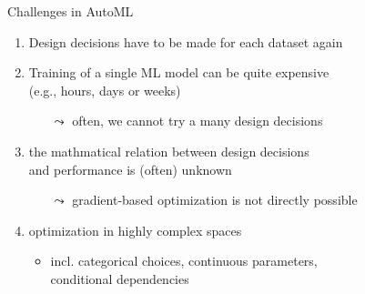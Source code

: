 \begin{frame}[c]{Challenges in AutoML}

\begin{enumerate}
  \item Design decisions have to be made for each dataset again
  \item Training of a single ML model can be quite expensive\\
  		(e.g., hours, days or weeks)
  \begin{itemize}
    \item[$\leadsto$] often, we cannot try a many design decisions
  \end{itemize}
  \item the mathmatical relation between design decisions\\ and performance is (often) unknown
  \begin{itemize}
    \item[$\leadsto$] gradient-based optimization is not directly possible
  \end{itemize}
  \item optimization in highly complex spaces
  \begin{itemize}
    \item incl. categorical choices, continuous parameters,\\ conditional dependencies
  \end{itemize}
  
\end{enumerate}

\end{frame}
